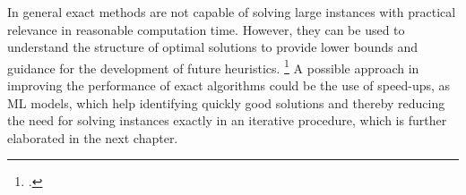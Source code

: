 \parbreak

In general exact methods are not capable of solving large instances with practical relevance
in reasonable computation time. However, they can be used to understand the structure
of optimal solutions to provide lower bounds and guidance for the development of future
heuristics. \footcite[cf.][p. 2]{tamke_branch-and-cut_2024} A possible approach in improving
the performance of exact algorithms could be the use of speed-ups, as \gls{ML} models, which
help identifying quickly good solutions and thereby reducing the need for solving instances
exactly in an iterative procedure, which is further elaborated in the next chapter.